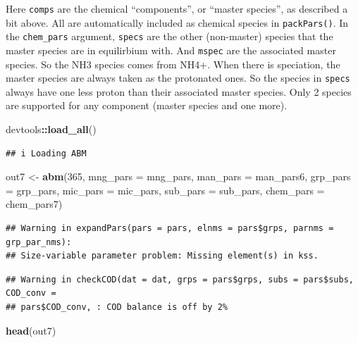 \documentclass[
]{article}
\newenvironment{Shaded}{\begin{snugshade}}{\end{snugshade}}
\newcommand{\AttributeTok}[1]{\textcolor[rgb]{0.13,0.29,0.53}{#1}}
\newcommand{\DecValTok}[1]{\textcolor[rgb]{0.00,0.00,0.81}{#1}}
\newcommand{\FunctionTok}[1]{\textcolor[rgb]{0.13,0.29,0.53}{\textbf{#1}}}
\newcommand{\NormalTok}[1]{#1}
\newcommand{\OtherTok}[1]{\textcolor[rgb]{0.56,0.35,0.01}{#1}}
\newcommand{\SpecialCharTok}[1]{\textcolor[rgb]{0.81,0.36,0.00}{\textbf{#1}}}
\begin{document}
Here \texttt{comps} are the chemical ``components'', or ``master
species'', as described a bit above. All are automatically included as
chemical species in \texttt{packPars()}. In the \texttt{chem\_pars}
argument, \texttt{specs} are the other (non-master) species that the
master species are in equilirbium with. And \texttt{mspec} are the
associated master species. So the NH3 species comes from NH4+. When
there is speciation, the master species are always taken as the
protonated ones. So the species in \texttt{specs} always have one less
proton than their associated master species. Only 2 species are
supported for any component (master species and one more).

\begin{Shaded}
\begin{Highlighting}[]
\NormalTok{devtools}\SpecialCharTok{::}\FunctionTok{load\_all}\NormalTok{()}
\end{Highlighting}
\end{Shaded}

\begin{verbatim}
## i Loading ABM
\end{verbatim}

\begin{Shaded}
\begin{Highlighting}[]
\NormalTok{out7 }\OtherTok{\textless{}{-}} \FunctionTok{abm}\NormalTok{(}\DecValTok{365}\NormalTok{,}
            \AttributeTok{mng\_pars =}\NormalTok{ mng\_pars,}
            \AttributeTok{man\_pars =}\NormalTok{ man\_pars6,}
            \AttributeTok{grp\_pars =}\NormalTok{ grp\_pars,}
            \AttributeTok{mic\_pars =}\NormalTok{ mic\_pars,}
            \AttributeTok{sub\_pars =}\NormalTok{ sub\_pars,}
            \AttributeTok{chem\_pars =}\NormalTok{ chem\_pars7)}
\end{Highlighting}
\end{Shaded}

\begin{verbatim}
## Warning in expandPars(pars = pars, elnms = pars$grps, parnms = grp_par_nms):
## Size-variable parameter problem: Missing element(s) in kss.
\end{verbatim}

\begin{verbatim}
## Warning in checkCOD(dat = dat, grps = pars$grps, subs = pars$subs, COD_conv =
## pars$COD_conv, : COD balance is off by 2%
\end{verbatim}

\begin{Shaded}
\begin{Highlighting}[]
\FunctionTok{head}\NormalTok{(out7)}
\end{Highlighting}
\end{Shaded}
\end{document}
